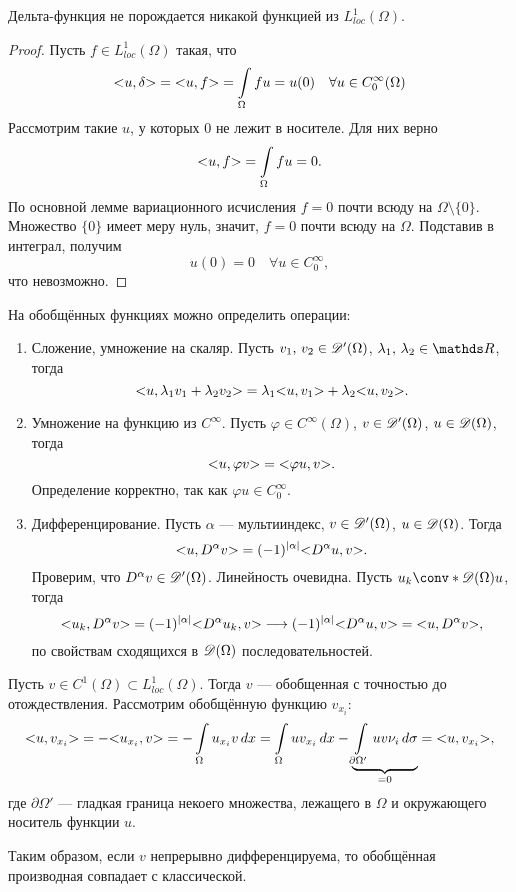 \begin{note}Дельта-функция не порождается никакой функцией из $L_{loc}^1(\Omega)$.
\end{note}
\begin{proof}
Пусть $f \in L_{loc}^1(\Omega)$ такая, что
$$ \action{u, \delta} = \action{u, f} = \int \limits_\Omega fu  = u(0) \quad \forall u \in C_0^{\infty}(\Omega)$$
Рассмотрим такие $u$, у которых $0$ не лежит в носителе. Для них верно
$$\action{u, f} = \int \limits_\Omega fu = 0.$$
По основной лемме вариационного исчисления $f = 0$ почти всюду на $\Omega \setminus \{0\}$. Множество $\{0\}$ имеет меру нуль, значит, $f = 0$ почти всюду на $\Omega$. Подставив в интеграл, получим
$$ u(0) = 0 \quad \forall u \in C_0^{\infty},$$
что невозможно.

\end{proof}

На обобщённых функциях можно определить операции:

\begin{enumerate}
\item Сложение, умножение на скаляр. Пусть $v_1, \, v_2 \in \mathscr{D}'(\Omega)$, $\lambda_1,\,\lambda_2 \in \real$, тогда
$$\action{u, \lambda_1v_1 + \lambda_2v_2} = \lambda_1\action{u, v_1} + \lambda_2\action{u, v_2}.$$
\item Умножение на функцию из $C^\infty$. Пусть $\varphi \in C^\infty(\Omega)$, $v\in \mathscr{D}'(\Omega)$, $u\in \mathscr{D}(\Omega)$, тогда
$$\action{u, \varphi v} = \action{\varphi u, v}.$$
Определение корректно, так как $\varphi u \in C_0^\infty$.
\item Дифференцирование. Пусть $\alpha$ --- мультииндекс, $v\in\mathscr{D}'(\Omega)$, $u \in \mathscr{D}(\Omega)$. Тогда
$$\action{u, D^\alpha v} = (-1)^{\abs{\alpha}}\action{D^\alpha u, v}.$$
Проверим, что $D^\alpha v\in \mathscr{D}'(\Omega)$. Линейность очевидна. Пусть $u_k \conv* {\beauD(\Omega)}{} u$, тогда
$$\action{u_k, D^\alpha v} = (-1)^{\abs{\alpha}} \action{D^\alpha u_k, v} \longrightarrow (-1)^{\abs{\alpha}} \action{D^\alpha u, v} = \action{u, D^\alpha v},$$
по свойствам сходящихся в $\mathscr{D}(\Omega)$ последовательностей.
\end{enumerate}

\begin{example}
Пусть $v \in C^1(\Omega) \subset L_{loc}^1(\Omega)$. Тогда $v$ --- обобщенная с точностью до отождествления. Рассмотрим обобщённую функцию $v_{x_i}$:
$$\action{u, v_{x_i}} = - \action{u_{x_i}, v }= - \int \limits_\Omega u_{x_i} v \, dx = \int \limits_\Omega u v_{x_i} \, dx - \underbrace{\int \limits_{\partial \Omega'} u v \nu_i \, d\sigma}_{=0} = \action{u, v_{x_i}},$$
где $\partial \Omega'$ --- гладкая граница некоего множества, лежащего в $\Omega$ и окружающего носитель функции $u$.

Таким образом, если $v$ непрерывно дифференцируема, то обобщённая производная совпадает с классической.
\end{example}

